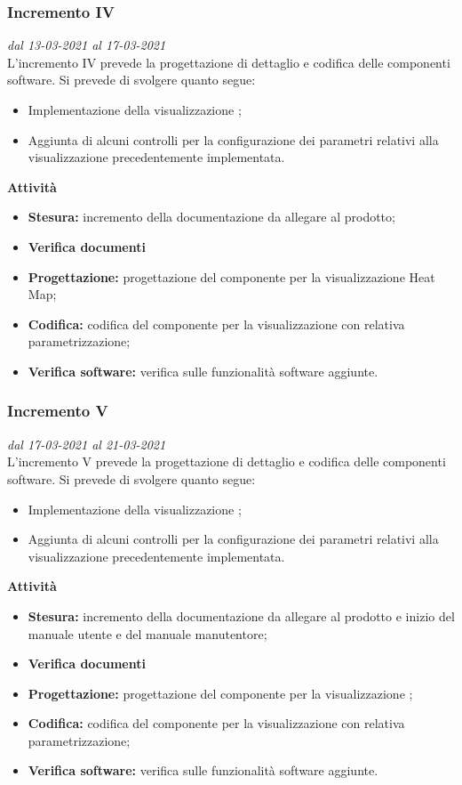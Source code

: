 \subsubsection{Incremento IV}
\textit{dal 13-03-2021 al 17-03-2021}\\
L'incremento IV prevede la progettazione di dettaglio e codifica delle componenti software. Si prevede di svolgere quanto segue:
\begin{itemize}
\item Implementazione della visualizzazione ;
\item Aggiunta di alcuni controlli per la configurazione dei parametri relativi alla visualizzazione precedentemente implementata.
\end{itemize}
\textbf{Attività}
\begin{itemize}
\item \textbf{Stesura:} incremento della documentazione da allegare al prodotto;
\item \textbf{Verifica documenti}
\item \textbf{Progettazione:} progettazione del componente per la visualizzazione Heat Map;
\item \textbf{Codifica:} codifica del componente per la visualizzazione con relativa parametrizzazione;
\item \textbf{Verifica software:} verifica sulle funzionalità software aggiunte.
\end{itemize}

\subsubsection{Incremento V}
\textit{dal 17-03-2021 al 21-03-2021}\\
L'incremento V prevede la progettazione di dettaglio e codifica delle componenti software. Si prevede di svolgere quanto segue:
\begin{itemize}
\item Implementazione della visualizzazione ;
\item Aggiunta di alcuni controlli per la configurazione dei parametri relativi alla visualizzazione precedentemente implementata.
\end{itemize}
\textbf{Attività}
\begin{itemize}
\item \textbf{Stesura:} incremento della documentazione da allegare al prodotto e inizio del manuale utente e del manuale manutentore;
\item \textbf{Verifica documenti}
\item \textbf{Progettazione:} progettazione del componente per la visualizzazione ;
\item \textbf{Codifica:} codifica del componente per la visualizzazione con relativa parametrizzazione;
\item \textbf{Verifica software:} verifica sulle funzionalità software aggiunte.
\end{itemize}

